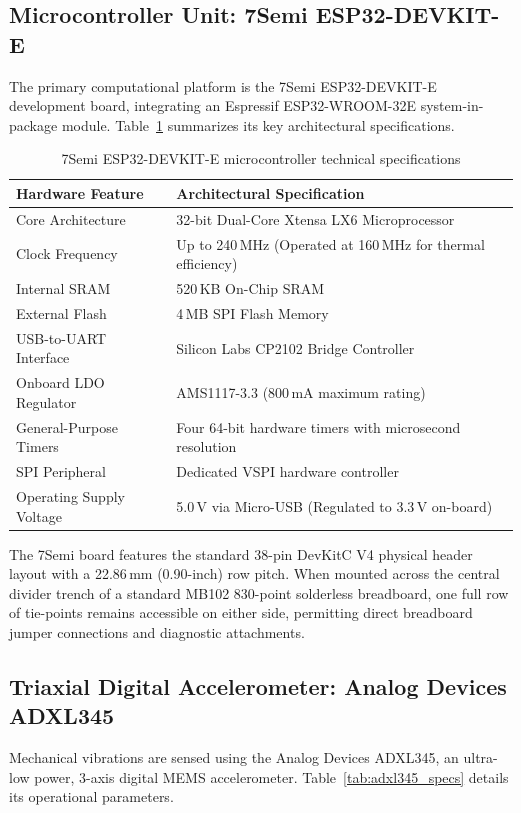 \subsection{Microcontroller Unit: 7Semi ESP32-DEVKIT-E}
\hspace{2em}The primary computational platform is the 7Semi ESP32-DEVKIT-E development board, integrating an Espressif ESP32-WROOM-32E system-in-package module. Table~\ref{tab:esp32_specs} summarizes its key architectural specifications.

\begin{table}[H]
\centering
\caption{7Semi ESP32-DEVKIT-E microcontroller technical specifications}
\label{tab:esp32_specs}
\small
\begin{tabularx}{\textwidth}{l X}
\toprule
\textbf{Hardware Feature} & \textbf{Architectural Specification} \\
\midrule
Core Architecture & 32-bit Dual-Core Xtensa LX6 Microprocessor \\
Clock Frequency & Up to 240\,MHz (Operated at 160\,MHz for thermal efficiency) \\
Internal SRAM & 520\,KB On-Chip SRAM \\
External Flash & 4\,MB SPI Flash Memory \\
USB-to-UART Interface & Silicon Labs CP2102 Bridge Controller \\
Onboard LDO Regulator & AMS1117-3.3 (800\,mA maximum rating) \\
General-Purpose Timers & Four 64-bit hardware timers with microsecond resolution \\
SPI Peripheral & Dedicated VSPI hardware controller \\
Operating Supply Voltage & 5.0\,V via Micro-USB (Regulated to 3.3\,V on-board) \\
\bottomrule
\end{tabularx}
\end{table}

\hspace{2em}The 7Semi board features the standard 38-pin DevKitC V4 physical header layout with a 22.86\,mm (0.90-inch) row pitch. When mounted across the central divider trench of a standard MB102 830-point solderless breadboard, one full row of tie-points remains accessible on either side, permitting direct breadboard jumper connections and diagnostic attachments.

\subsection{Triaxial Digital Accelerometer: Analog Devices ADXL345}
\hspace{2em}Mechanical vibrations are sensed using the Analog Devices ADXL345, an ultra-low power, 3-axis digital MEMS accelerometer. Table~\ref{tab:adxl345_specs} details its operational parameters.

